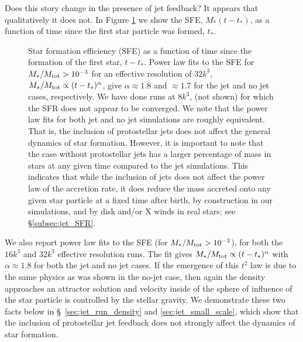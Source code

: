 \documentclass[../dissertation.tex]{subfiles}
\begin{document}
Does this story change in the presence of jet feedback? It appears that qualitatively it does not.  In Figure \ref{fig:jet_sfr} we show the SFE, $M_*(t-t_*)$, as a function of time since the first star particle was formed, $t_*$.
%
\begin{figure}[htb] %
  \caption[Jet - SFR]{Star formation efficiency (SFE) as a function of time since the formation of the first star, $t-t_*$. 
    Power law fits to the SFE for $M_*/M_{\rm tot} > 10^{-3}$ for an effective resolution of $32k^3$, $M_*/M_{\rm tot} \propto (t - t_*)^{\alpha}$, give $\alpha \approx 1.8$ and $\approx 1.7$ for the jet and no jet cases, respectively.
    We have done runs at $8k^3$, (not shown) for which the SFR does not appear to be converged.
    We note that the power law fits for both jet and no jet simulations are roughly equivalent. 
    That is, the inclusion of protostellar jets does not affect the general dynamics of star formation. 
    However, it is important to note that the case without protostellar jets has a larger percentage of mass in stars at any given time compared to the jet simulations. 
    This indicates that while the inclusion of jets does not affect the power law of the accretion rate, it does reduce the mass accreted onto any given star particle at a fixed time after birth, by construction in our simulations, and by disk and/or X winds in real stars; see \S \ref{subsec:jet_SFR}.}
    \label{fig:jet_sfr}
\end{figure}
%
We also report power law fits to the SFE (for $M_*/M_{\rm tot} > 10^{-3}$), for both the $16k^3$ and $32k^3$ effective resolution runs.
The fit gives $M_*/M_{\rm tot} \propto (t - t_*)^{\alpha}$ with $\alpha \approx 1.8$ for both the jet and no jet cases. If the emergence of this $t^2$ law is due to the same physics as was shown in the no-jet case, then again the density approaches an attractor solution and velocity inside of the sphere of influence of the star particle is controlled by the stellar gravity.  We demonstrate these two facts below in \S~\ref{sec:jet_run_density} and \ref{sec:jet_small_scale}, which show that the inclusion of protostellar jet feedback does not strongly affect the dynamics of star formation.
\end{document}

